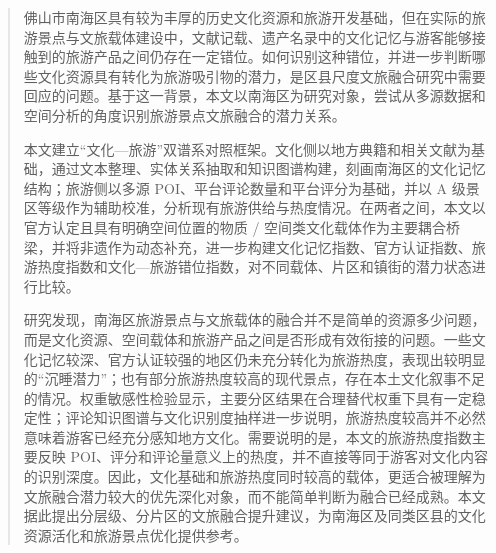 
\begin{abstract}
佛山市南海区具有较为丰厚的历史文化资源和旅游开发基础，但在实际的旅游景点与文旅载体建设中，文献记载、遗产名录中的文化记忆与游客能够接触到的旅游产品之间仍存在一定错位。如何识别这种错位，并进一步判断哪些文化资源具有转化为旅游吸引物的潜力，是区县尺度文旅融合研究中需要回应的问题。基于这一背景，本文以南海区为研究对象，尝试从多源数据和空间分析的角度识别旅游景点文旅融合的潜力关系。

本文建立“文化—旅游”双谱系对照框架。文化侧以地方典籍和相关文献为基础，通过文本整理、实体关系抽取和知识图谱构建，刻画南海区的文化记忆结构；旅游侧以多源 POI、平台评论数量和平台评分为基础，并以 A 级景区等级作为辅助校准，分析现有旅游供给与热度情况。在两者之间，本文以官方认定且具有明确空间位置的物质 / 空间类文化载体作为主要耦合桥梁，并将非遗作为动态补充，进一步构建文化记忆指数、官方认证指数、旅游热度指数和文化—旅游错位指数，对不同载体、片区和镇街的潜力状态进行比较。

研究发现，南海区旅游景点与文旅载体的融合并不是简单的资源多少问题，而是文化资源、空间载体和旅游产品之间是否形成有效衔接的问题。一些文化记忆较深、官方认证较强的地区仍未充分转化为旅游热度，表现出较明显的“沉睡潜力”；也有部分旅游热度较高的现代景点，存在本土文化叙事不足的情况。权重敏感性检验显示，主要分区结果在合理替代权重下具有一定稳定性；评论知识图谱与文化识别度抽样进一步说明，旅游热度较高并不必然意味着游客已经充分感知地方文化。需要说明的是，本文的旅游热度指数主要反映 POI、评分和评论量意义上的热度，并不直接等同于游客对文化内容的识别深度。因此，文化基础和旅游热度同时较高的载体，更适合被理解为文旅融合潜力较大的优先深化对象，而不能简单判断为融合已经成熟。本文据此提出分层级、分片区的文旅融合提升建议，为南海区及同类区县的文化资源活化和旅游景点优化提供参考。

\end{abstract}

